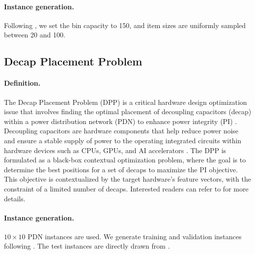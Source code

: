 \paragraph{Instance generation.}
Following \citet{levine2004_aco_bpp_human_bl}, we set the bin capacity to 150, and item sizes are uniformly sampled between 20 and 100.


\subsection{Decap Placement Problem}
\paragraph{Definition.}
The Decap Placement Problem (DPP) is a critical hardware design optimization issue that involves finding the optimal placement of decoupling capacitors (decap) within a power distribution network (PDN) to enhance power integrity (PI) \citep{popovich2007power, shibasaka2013decoupling, erdin2019multi, park2023versatile}. Decoupling capacitors are hardware components that help reduce power noise and ensure a stable supply of power to the operating integrated circuits within hardware devices such as CPUs, GPUs, and AI accelerators \citep{popovich2007power}. The DPP is formulated as a black-box contextual optimization problem, where the goal is to determine the best positions for a set of decaps to maximize the PI objective. This objective is contextualized by the target hardware's feature vectors, with the constraint of a limited number of decaps. Interested readers can refer to \citep{kim2023devformer} for more details.



\paragraph{Instance generation.}
$10 \times 10$ PDN instances are used. We generate training and validation instances following \citet{kim2023devformer}. The test instances are directly drawn from \cite{kim2023devformer}.